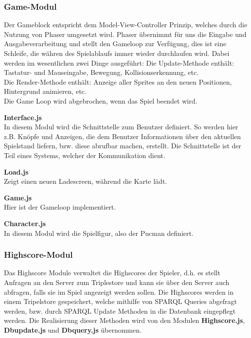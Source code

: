 \documentclass[11pt,a4paper]{article}
\begin{document}
\subsubsection{Game-Modul}
Der Gameblock entspricht dem Model-View-Controller Prinzip, welches durch die Nutzung von Phaser umgesetzt wird. 
Phaser übernimmt für uns die Eingabe und Ausgabeverarbeitung und stellt den Gameloop zur Verfügung, dies ist eine Schleife, die währen des Spielablaufs immer wieder durchlaufen wird.
Dabei werden im wesentlichen zwei Dinge ausgeführt:
Die Update-Methode enthält: Tastatur- und Mauseingabe, Bewegung, Kollisionserkennung, etc. \\
Die Render-Methode enthält: Anzeige aller Sprites an den neuen Positionen, Hintergrund animieren, etc. \\
Die Game Loop wird abgebrochen, wenn das Spiel beendet wird.
\par\bigskip
{\flushleft \textbf{Interface.js}} \\
In diesem Modul wird die Schnittstelle zum Benutzer definiert.
So werden hier z.B. Knöpfe und Anzeigen, die dem Benutzer Informationen über den aktuellen Spielstand liefern, bzw. diese abrufbar machen, erstellt.
Die Schnittstelle ist der Teil eines Systems, welcher der Kommunikation dient. \par\bigskip
{\flushleft \textbf{Load.js}} \\
Zeigt einen neuen Ladescreen, während die Karte lädt. \par\bigskip
{\flushleft \textbf{Game.js}} \\
Hier ist der Gameloop implementiert. \par\bigskip
{\flushleft\textbf{Character.js}} \\
In diesem Modul wird die Spielfigur, also der Pucman definiert.

\subsubsection{Highscore-Modul}
Das Highscore Module verwaltet die Highscores der Spieler, d.h. es stellt Anfragen an den Server zum Triplestore und kann sie über den Server auch abfragen, falls sie im Spiel angezeigt werden sollen.
Die Highscores werden in einem Tripelstore gespeichert, welche mithilfe von SPARQL Queries abgefragt werden, bzw. durch  SPARQL Update Methoden in die Datenbank eingepflegt werden.
Die Realisierung dieser Methoden wird von den Modulen
\textbf{Highscore.js}, \textbf{Dbupdate.js} und \textbf{Dbquery.js} übernommen.
\end{document}
